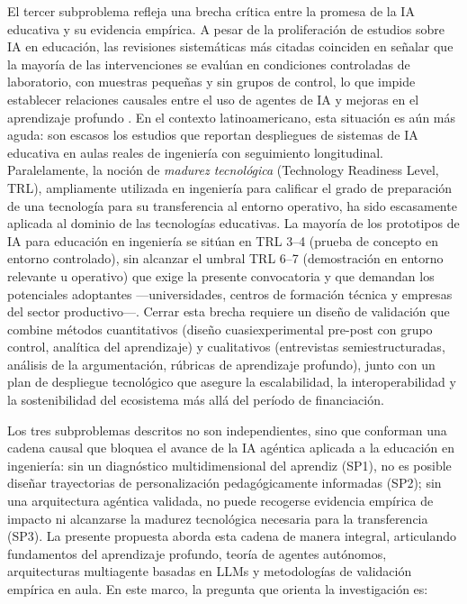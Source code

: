 El tercer subproblema refleja una brecha crítica entre la promesa de la IA educativa y su
evidencia empírica. A pesar de la proliferación de estudios sobre IA en educación, las
revisiones sistemáticas más citadas coinciden en señalar que la mayoría de las
intervenciones se evalúan en condiciones controladas de laboratorio, con muestras pequeñas
y sin grupos de control, lo que impide establecer relaciones causales entre el uso de
agentes de IA y mejoras en el aprendizaje profundo \cite{zawacki2019systematic,
hooshyar2024systematic}. En el contexto latinoamericano, esta situación es aún más aguda: son
escasos los estudios que reportan despliegues de sistemas de IA educativa en aulas reales
de ingeniería con seguimiento longitudinal. Paralelamente, la noción de \emph{madurez
tecnológica} (Technology Readiness Level, TRL), ampliamente utilizada en ingeniería para
calificar el grado de preparación de una tecnología para su transferencia al entorno
operativo, ha sido escasamente aplicada al dominio de las tecnologías educativas. La
mayoría de los prototipos de IA para educación en ingeniería se sitúan en TRL 3--4
(prueba de concepto en entorno controlado), sin alcanzar el umbral TRL 6--7 (demostración
en entorno relevante u operativo) que exige la presente convocatoria y que demandan los
potenciales adoptantes —universidades, centros de formación técnica y empresas del sector
productivo—. Cerrar esta brecha requiere un diseño de validación que combine métodos
cuantitativos (diseño cuasiexperimental pre-post con grupo control, analítica del
aprendizaje) y cualitativos (entrevistas semiestructuradas, análisis de la argumentación,
rúbricas de aprendizaje profundo), junto con un plan de despliegue tecnológico que asegure
la escalabilidad, la interoperabilidad y la sostenibilidad del ecosistema más allá del
período de financiación.


Los tres subproblemas descritos no son independientes, sino que conforman una cadena causal
que bloquea el avance de la IA agéntica aplicada a la educación en ingeniería: sin un
diagnóstico multidimensional del aprendiz (SP1), no es posible diseñar trayectorias de
personalización pedagógicamente informadas (SP2); sin una arquitectura agéntica validada,
no puede recogerse evidencia empírica de impacto ni alcanzarse la madurez tecnológica
necesaria para la transferencia (SP3). La presente propuesta aborda esta cadena de manera
integral, articulando fundamentos del aprendizaje profundo, teoría de agentes autónomos,
arquitecturas multiagente basadas en LLMs y metodologías de validación empírica en aula.
En este marco, la pregunta que orienta la investigación es:

